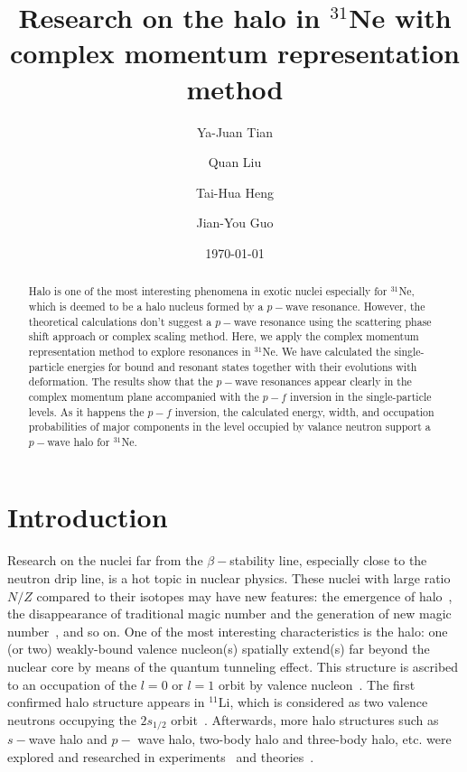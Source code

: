 \documentclass[twocolumn,prc,showpacs,preprintnumbers,superscriptaddress,floatfix]{revtex4}
\begin{document}
\title{Research on the halo in $^{31}$Ne with complex momentum
representation method}
\author{Ya-Juan Tian}
\author{Quan Liu}
\author{Tai-Hua Heng}
\author{Jian-You Guo}
\date{\today }

\begin{abstract}
Halo is one of the most interesting phenomena in exotic nuclei especially
for $^{31}$Ne, which is deemed to be a halo nucleus formed by a $p-$wave
resonance. However, the theoretical calculations don't suggest a $p-$wave
resonance using the scattering phase shift approach or complex scaling
method. Here, we apply the complex momentum representation method to explore
resonances in $^{31}$Ne. We have calculated the single-particle energies for
bound and resonant states together with their evolutions with deformation.
The results show that the $p-$wave resonances appear clearly in the complex
momentum plane accompanied with the $p-f$ inversion in the single-particle
levels. As it happens the $p-f$ inversion, the calculated energy, width, and
occupation probabilities of major components in the level occupied by
valance neutron support a $p-$wave halo for $^{31}$Ne.
\end{abstract}

\maketitle

\section{Introduction}

Research on the nuclei far from the $\beta-$stability line, especially close
to the neutron drip line, is a hot topic in nuclear physics. These nuclei
with large ratio $N/Z$ compared to their isotopes may have new features: the
emergence of halo~\cite{Tanihata1985}, the disappearance of traditional
magic number and the generation of new magic number~\cite{Ozawa2000}, and so
on. One of the most interesting characteristics is the halo: one (or two)
weakly-bound valence nucleon(s) spatially extend(s) far beyond the nuclear
core by means of the quantum tunneling effect. This structure is ascribed to
an occupation of the $l=0$ or $l=1$ orbit by valence nucleon~\cite%
{Sagawa1992}. The first confirmed halo structure appears in $^{11}$Li, which
is considered as two valence neutrons occupying the $2s_{1/2}$ orbit~\cite%
{Meng1996}. Afterwards, more halo structures such as $s-$wave halo and $p-$%
wave halo, two-body halo and three-body halo, etc. were explored and
researched in experiments~\cite{Tanihata2013} and theories~\cite{Meng2015}.
\end{document}
